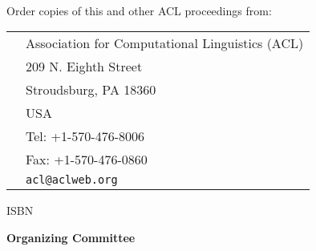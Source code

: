 \documentclass[11pt,oneside]{book}
\begin{document}
\vspace*{11cm}
{\large

\noindent
\textcopyright {} \\

\vspace*{2cm}
\noindent
Order copies of this and other ACL proceedings from:

\vspace*{1cm}
\begin{tabular}{p{1.5cm}l}
& Association for Computational Linguistics (ACL)\\
& 209 N. Eighth Street\\
& Stroudsburg, PA 18360\\
& USA\\
& Tel: +1-570-476-8006\\
& Fax: +1-570-476-0860\\
&{\tt acl@aclweb.org}\\
\end{tabular}

\vspace*{1cm}
ISBN 
}
\newpage


  \begin{center}
   { \Large \textbf{}}
  \end{center}
  \vspace*{0.5cm}
  \newpage
{}

\begin{center}
{\Large \textbf{Organizing Committee}}
\end{center}
\vspace*{1cm}
\begin{description}
  \item{\bf {}}\vspace{2mm}\\
    \\
\end{description}
\newpage
{}
\end{document}
